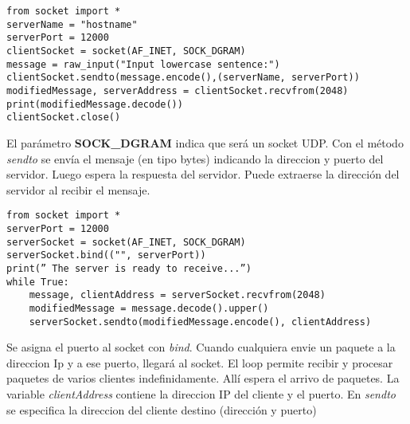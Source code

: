 \begin{lstlisting}[caption = Cliente UDP]
from socket import *
serverName = "hostname"
serverPort = 12000
clientSocket = socket(AF_INET, SOCK_DGRAM)
message = raw_input("Input lowercase sentence:")
clientSocket.sendto(message.encode(),(serverName, serverPort))
modifiedMessage, serverAddress = clientSocket.recvfrom(2048)
print(modifiedMessage.decode())
clientSocket.close()
\end{lstlisting}

El parámetro \textbf{SOCK\_DGRAM} indica que será un socket UDP. Con el método \textit{sendto} se envía el mensaje (en tipo bytes) indicando la direccion y puerto del servidor. Luego espera la respuesta del servidor. Puede extraerse la dirección del servidor al recibir el mensaje.

\begin{lstlisting}[caption = Servidor UDP]
from socket import *
serverPort = 12000
serverSocket = socket(AF_INET, SOCK_DGRAM)
serverSocket.bind(("", serverPort))
print(” The server is ready to receive...”)
while True:
    message, clientAddress = serverSocket.recvfrom(2048)
    modifiedMessage = message.decode().upper()
    serverSocket.sendto(modifiedMessage.encode(), clientAddress)
\end{lstlisting}

Se asigna el puerto al socket con \textit{bind}. Cuando cualquiera envie un paquete a la direccion Ip y a ese puerto, llegará al socket. El loop permite recibir y procesar paquetes de varios clientes indefinidamente. Allí espera el arrivo de paquetes. La variable \textit{clientAddress} contiene la direccion IP del cliente y el puerto. En \textit{sendto} se especifica la direccion del cliente destino (dirección y puerto)
